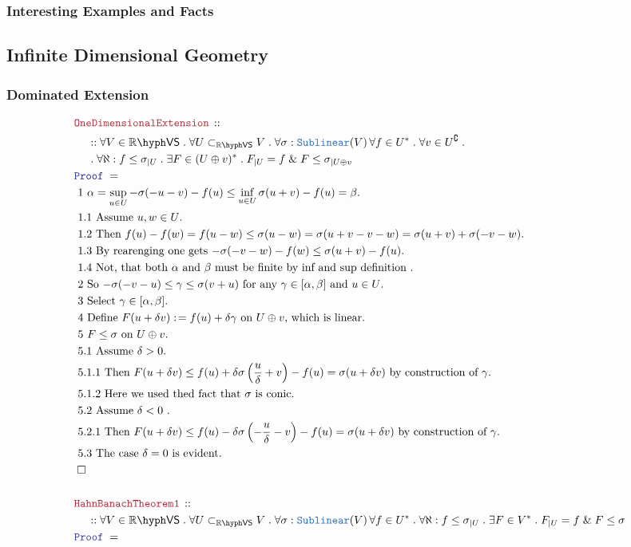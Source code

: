 \documentclass[12pt]{scrartcl}
\newcommand{\TYPE}[1]{\textcolor{NavyBlue}{\mathtt{#1}}}
\newcommand{\LOGIC}[1]{\textcolor{Blue}{\mathtt{#1}}}
\newcommand{\THM}[1]{\textcolor{Maroon}{\mathtt{#1}}}
\renewcommand{\.}{\; . \;}
\newcommand{\de}{: \kern 0.1pc =}
\newcommand{\Theorem}[2]{& \THM{#1} \, :: \, #2 \\ & \Proof = \\ }
\newcommand{\NewLine}{\\ & \kern 1pc}
\newcommand{\Page}[1]{ \begin{align*} #1 \end{align*}   }
\newcommand{\Explain}[1]{& \text{#1.} \\}
\renewcommand{\And}{\; \& \;}
\newcommand{\Reals}{\mathbb{R} }
\renewcommand{\c}{\complement}
\newcommand{\QED}{\; \square}
\newcommand{\EndProof}{& \QED \\}
\newcommand{\Proof}{\LOGIC{Proof} \; }
\newcommand{\subvec}[1]{\subset_{\VS{#1}}}%
\newcommand{\VS}[1]{#1\hyph\mathsf{VS}} %
\begin{document}
\subsubsection{Interesting Examples and Facts}
\newpage
\subsection{Infinite Dimensional Geometry}
\subsubsection{Dominated Extension}
\Page{
	\Theorem{OneDimensionalExtension}
	{
		\NewLine ::		
		\forall V \in \VS{\Reals} \.
		\forall U \subvec{\Reals} V \.
		\forall \sigma : \TYPE{Sublinear}(V) \,
		\forall f \in U^* \.
		\forall v \in U^\c \. \NewLine \.
		\forall \aleph :  f \le \sigma_{|U} \.
		\exists F \in (U \oplus v)^* \.
		F_{|U} = f \And F \le \sigma_{|U \oplus v}
	}
	\Explain{ 1   
		$
			\alpha = \sup_{u \in U}  -\sigma(-u-v) - f(u) \le 
		 	\inf_{u \in U} \sigma(u  +  v) - f(u) = \beta		
		$}
	\Explain{ 1.1 Assume $u,w \in U$}
	\Explain{ 1.2 Then $f(u) - f(w) = f(u - w) \le \sigma(u -w)  =
		\sigma( u + v - v - w) = \sigma(u + v) + \sigma(-v - w)$}
	\Explain{ 1.3 By rearenging one gets
		$
			- \sigma(-v- w) - f(w) \le  \sigma(u + v) - f(u)
		$}
	\Explain{ 1.4 Not, that both $\alpha$ and $\beta$ must be finite by
		inf and sup definition }
	\Explain{ 2 So  $-\sigma(-v-u) \le \gamma \le \sigma(v+u)$
			for any $\gamma \in [\alpha,\beta]$ and $u \in U$}
	\Explain{ 3 Select $\gamma \in [\alpha,\beta]$}
	\Explain{ 4 Define $F(u + \delta v) \de f(u) + \delta \gamma$ on $U \oplus v$, which is linear}
	\Explain{ 5 $F \le \sigma$  on $U \oplus v$}
	\Explain{ 5.1 Assume $\delta > 0$}
	\Explain{ 5.1.1 Then 
			$F(u + \delta v) \le f(u) + \delta\sigma\left( \frac{u}{\delta} + v \right) - f(u) = 
			  \sigma(u + \delta v)$ by construction of $\gamma$}
	\Explain{ 5.1.2 Here we used thed fact that $\sigma$ is conic}
	\Explain{ 5.2 Assume $\delta < 0$  }
	\Explain{ 5.2.1 Then
		$F(u + \delta v) \le f(u)  - \delta\sigma\left( -\frac{u}{\delta} - v \right) - f(u) = 
			  \sigma(u + \delta v)$  by construction of $\gamma$}
	\Explain{ 5.3 The case $\delta = 0$ is evident}
	\EndProof
	\\
	\Theorem{HahnBanachTheorem1}
	{
		\NewLine ::		
		\forall V \in \VS{\Reals} \.
		\forall U \subvec{\Reals} V \.
		\forall \sigma : \TYPE{Sublinear}(V) \,
		\forall f \in U^* \.
		\forall \aleph :  f \le \sigma_{|U} \.
		\exists F \in V^* \.
		F_{|U} = f \And F \le \sigma
}}
\end{document}
